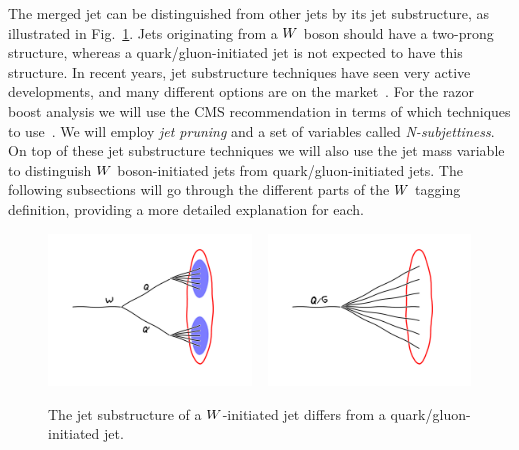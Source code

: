 The merged jet can be distinguished from other jets by its jet substructure, as illustrated in
Fig.~\ref{fig:boost_wtag_cartoon}. Jets originating from a $W$ boson should have a two-prong
structure, whereas a quark/gluon-initiated jet is not expected to have this structure. 
In recent years, jet substructure techniques have seen very active developments, and many different
options are on the market~\cite{Krohn:2009th,Gallicchio:2010sw,Butterworth:2008iy,Kaplan:2008ie}.
For the razor boost analysis we will use the CMS recommendation
in terms of which techniques to use~\cite{CMS-PAS-JME-13-006,Khachatryan:2014vla}. We will employ
\textit{jet pruning} and a set of variables called \textit{N-subjettiness}. On top of these jet
substructure techniques we will also use the jet mass variable to distinguish $W$ boson-initiated
jets
from quark/gluon-initiated jets. 
The following subsections will go through the different parts of the
$W$ tagging definition, providing a more detailed explanation for each.

\begin{figure}
  \centering
  \includegraphics[width=0.48\textwidth]{figures/razor_wtag/W_subjets}
  ~
  \includegraphics[width=0.48\textwidth]{figures/razor_wtag/qg_jets}
  \caption{The jet substructure of a $W$-initiated jet differs from a quark/gluon-initiated jet.
  \label{fig:boost_wtag_cartoon}}
\end{figure}


